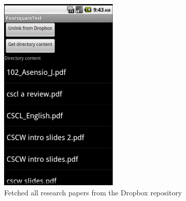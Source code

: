 \begin{figure}[h!]
\centering
\includegraphics[width=0.5\textwidth]{images/chap7_dropbox1.png}
\caption{Fetched all research papers from the Dropbox repository}
\label{fig:coll_dropbox1}
\end{figure}
